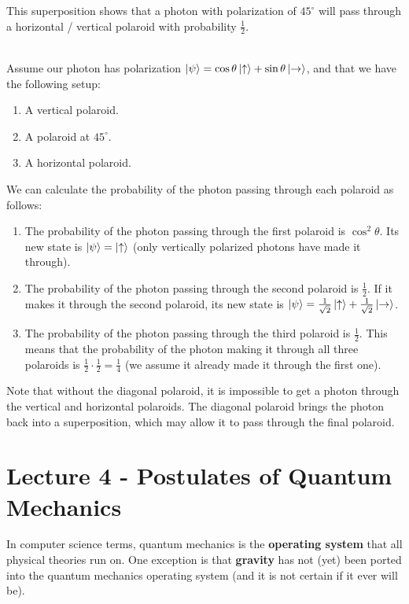 \documentclass[12pt]{article}
\begin{document}
\newpage
\noindent
This superposition shows that a photon with polarization of $45^\circ$ will pass through a horizontal / vertical polaroid with probability $\frac{1}{2}$.

\noindent
\\
Assume our photon has polarization $\ket{\psi} = \cos \theta \ket{\uparrow} + \sin \theta \ket{\rightarrow}$, and that we have the following setup:

\begin{enumerate}
    \item A vertical polaroid.
    \item A polaroid at $45^\circ$.
    \item A horizontal polaroid.
\end{enumerate}

\noindent
We can calculate the probability of the photon passing through each polaroid as follows:

\begin{enumerate}
    \item The probability of the photon passing through the first polaroid is $\cos^2 \theta$.
    Its new state is $\ket{\psi} = \ket{\uparrow}$ (only vertically polarized photons have made it through).
    \item The probability of the photon passing through the second polaroid is $\frac{1}{2}$.
    If it makes it through the second polaroid, its new state is $\ket{\psi} = \frac{1}{\sqrt{2}}\ket{\uparrow} + \frac{1}{\sqrt{2}}\ket{\rightarrow}$.
    \item The probability of the photon passing through the third polaroid is $\frac{1}{2}$.
    This means that the probability of the photon making it through all three polaroids is $\frac{1}{2} \cdot \frac{1}{2} = \frac{1}{4}$ (we assume it already made it through the first one).
\end{enumerate}

\noindent
Note that without the diagonal polaroid, it is impossible to get a photon through the vertical and horizontal polaroids.
The diagonal polaroid brings the photon back into a superposition, which may allow it to pass through the final polaroid.

%
%
\section*{Lecture 4 - Postulates of Quantum Mechanics}
In computer science terms, quantum mechanics is the \textbf{operating system} that all physical theories run on.
One exception is that \textbf{gravity} has not (yet) been ported into the quantum mechanics operating system (and it is not certain if it ever will be).
\end{document}
